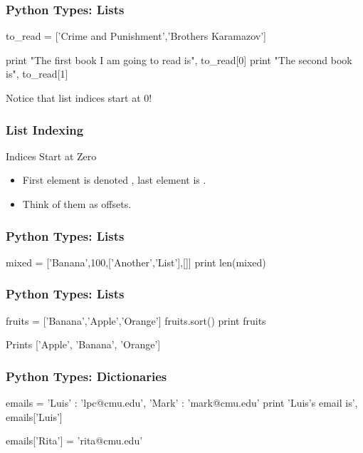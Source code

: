 \begin{frame}[fragile]
\frametitle{Python Types: Lists}
\begin{python}
to_read = ['Crime and Punishment','Brothers Karamazov']

print "The first book I am going to read is", to_read[0]
print "The second book is", to_read[1]

\end{python}

Notice that list indices start at \alert{0}!

\end{frame}

\begin{frame}[fragile]
\frametitle{List Indexing}
\begin{block}{Indices Start at Zero}
\begin{itemize}
\item First element is denoted , last element is .
\item Think of them as \alert{offsets}.
\end{itemize}
\end{block}
\end{frame}


\begin{frame}[fragile]
\frametitle{Python Types: Lists}

\begin{python}
mixed = ['Banana',100,['Another','List'],[]]
print len(mixed)
\end{python}

\end{frame}

\begin{frame}[fragile]
\frametitle{Python Types: Lists}

\begin{python}
fruits = ['Banana','Apple','Orange']
fruits.sort()
print fruits
\end{python}

Prints ['Apple', 'Banana', 'Orange']

\end{frame}

\begin{frame}[fragile]
\frametitle{Python Types: Dictionaries}
\begin{python}
emails = { 'Luis' : 'lpc@cmu.edu',
           'Mark' : 'mark@cmu.edu' }
print 'Luis's email is', emails['Luis']

emails['Rita'] = 'rita@cmu.edu'
\end{python}

\end{frame}

